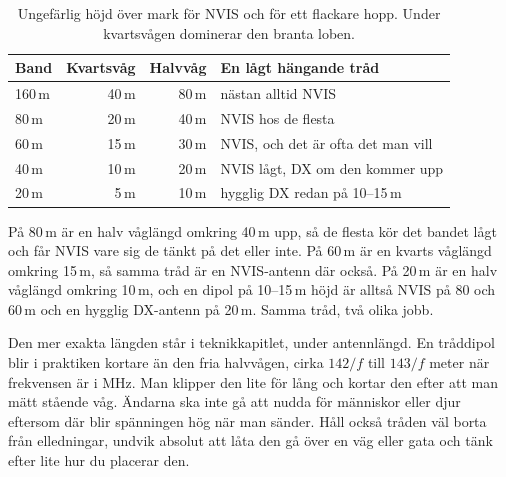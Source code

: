 \begin{table}[H]
\centering
\begin{tabular}{lrrl}
	\bf Band & \bf Kvartsvåg & \bf Halvvåg & \bf En lågt hängande tråd          \\ \hline
	160\,m   &         40\,m &       80\,m & nästan alltid NVIS                 \\
	80\,m    &         20\,m &       40\,m & NVIS hos de flesta                 \\
	60\,m    &         15\,m &       30\,m & NVIS, och det är ofta det man vill \\
	40\,m    &         10\,m &       20\,m & NVIS lågt, DX om den kommer upp    \\
	20\,m    &          5\,m &       10\,m & hygglig DX redan på 10--15\,m
\end{tabular}
\caption{Ungefärlig höjd över mark för NVIS och för ett flackare hopp.
Under kvartsvågen dominerar den branta loben.}
\label{tab:dipolhojd}
\end{table}

På 80\,m är en halv våglängd omkring 40\,m upp, så de flesta kör det
bandet lågt och får NVIS vare sig de tänkt på det eller inte. På 60\,m
är en kvarts våglängd omkring 15\,m, så samma tråd är en NVIS-antenn
där också. På 20\,m är en halv våglängd omkring 10\,m, och en dipol på
10--15\,m höjd är alltså NVIS på 80 och 60\,m och en hygglig DX-antenn
på 20\,m. Samma tråd, två olika jobb.

Den mer exakta längden står i teknikkapitlet, under antennlängd. En
tråddipol blir i praktiken kortare än den fria halvvågen, cirka
$142/f$ till $143/f$ meter när frekvensen är i MHz. Man klipper den
lite för lång och kortar den efter att man mätt stående våg. Ändarna
ska inte gå att nudda för människor eller djur eftersom där blir
spänningen hög när man sänder. Håll också tråden väl borta från
elledningar, undvik absolut att låta den gå över en väg eller gata och
tänk efter lite hur du placerar den.

